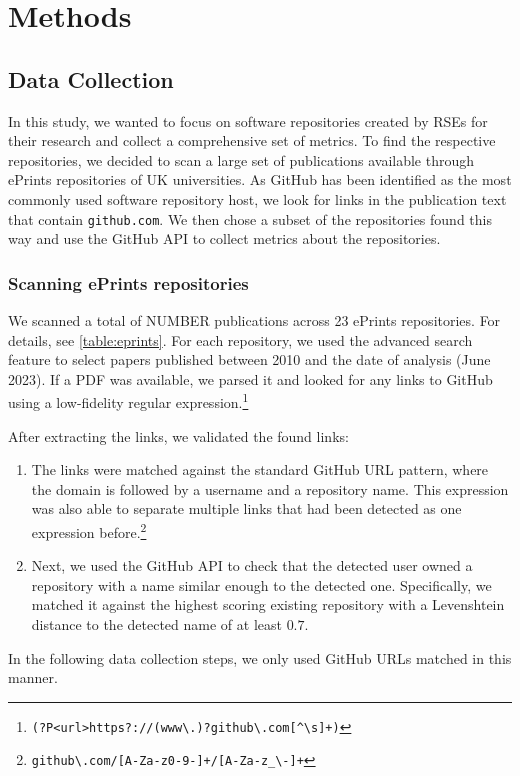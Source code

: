 \documentclass[10pt,a4paper]{scrartcl}
\begin{document}
\section{Methods}

\subsection*{Data Collection}

In this study, we wanted to focus on software repositories created by RSEs for their research and collect a comprehensive set of metrics.
To find the respective repositories, we decided to scan a large set of publications available through ePrints repositories of UK universities.
As GitHub has been identified as the most commonly used software repository host, we look for links in the publication text that contain \verb|github.com|.
We then chose a subset of the repositories found this way and use the GitHub API to collect metrics about the repositories.

\subsubsection*{Scanning ePrints repositories}

We scanned a total of NUMBER publications across 23 ePrints repositories. For details, see \ref{table:eprints}.
For each repository, we used the advanced search feature to select papers published between 2010 and the date of analysis (June 2023).
If a PDF was available, we parsed it and looked for any links to GitHub using a low-fidelity regular expression.\footnote{\verb|(?P<url>https?://(www\.)?github\.com[^\s]+)|}

After extracting the links, we validated the found links:
\begin{enumerate}
    \item The links were matched against the standard GitHub URL pattern, where the domain is followed by a username and a repository name. This expression was also able to separate multiple links that had been detected as one expression before.\footnote{\verb|github\.com/[A-Za-z0-9-]+/[A-Za-z_\-]+|}
    \item Next, we used the GitHub API to check that the detected user owned a repository with a name similar enough to the detected one. Specifically, we matched it against the highest scoring existing repository with a Levenshtein distance to the detected name of at least $0.7$.
\end{enumerate}
In the following data collection steps, we only used GitHub URLs matched in this manner.
\end{document}
